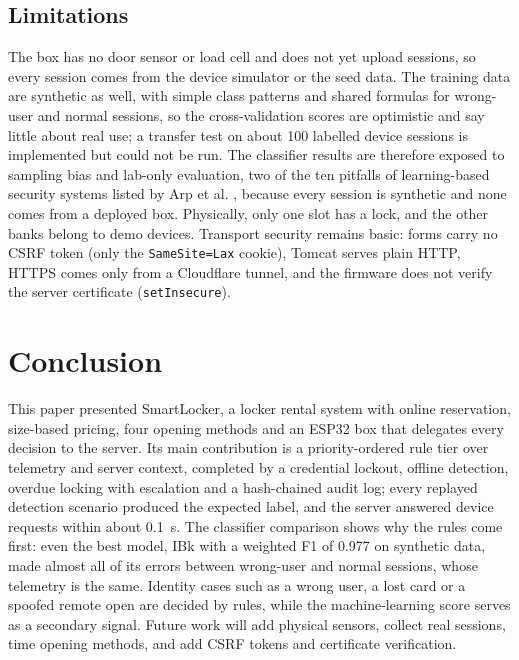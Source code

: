\documentclass[journal,onecolumn]{IEEEtran}
\begin{document}
\subsection{Limitations}
\label{sec:limits}

The box has no door sensor or load cell and does not yet upload sessions, so every session comes from the device
simulator or the seed data. The training data are synthetic as well, with simple class patterns and shared formulas
for wrong-user and normal sessions, so the cross-validation scores are optimistic and say little about real use; a
transfer test on about 100 labelled device sessions is implemented but could not be run. The classifier results are
therefore exposed to sampling bias and lab-only evaluation, two of the ten pitfalls of learning-based security systems
listed by Arp et al. \cite{arp2024pitfalls}, because every session is synthetic and none comes from a deployed box.
Physically, only one slot has a lock, and the other banks belong to demo devices. Transport security remains basic:
forms carry no CSRF token (only the \texttt{SameSite=Lax} cookie), Tomcat serves plain HTTP, HTTPS comes only from a
Cloudflare tunnel, and the firmware does not verify the server certificate (\texttt{setInsecure}).

\section{Conclusion}

This paper presented SmartLocker, a locker rental system with online reservation, size-based pricing, four opening
methods and an ESP32 box that delegates every decision to the server. Its main contribution is a priority-ordered rule
tier over telemetry and server context, completed by a credential lockout, offline detection, overdue locking with
escalation and a hash-chained audit log; every replayed detection scenario produced the expected label, and the server
answered device requests within about 0.1~s. The classifier comparison shows why the rules come first: even the best
model, IBk with a weighted F1 of 0.977 on synthetic data, made almost all of its errors between wrong-user and normal
sessions, whose telemetry is the same. Identity cases such as a wrong user, a lost card or a spoofed remote open are
decided by rules, while the machine-learning score serves as a secondary signal. Future work will add physical sensors,
collect real sessions, time opening methods, and add CSRF tokens and certificate verification.
\end{document}
